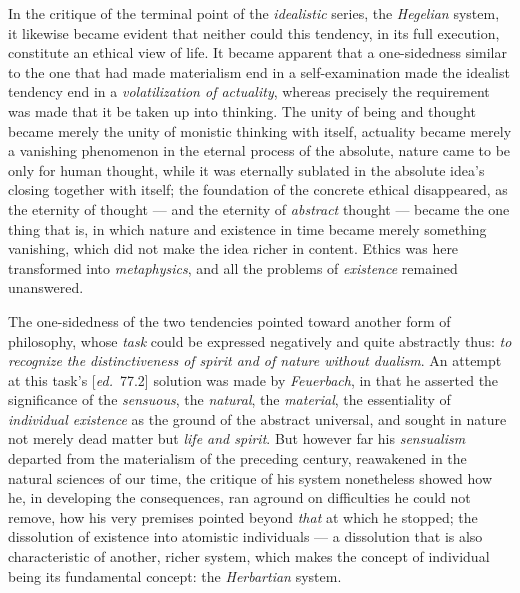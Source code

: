 \documentclass[12pt,a4paper,openany]{book}
\newcommand{\kpage}[1]{\marginnote{\footnotesize\textit{[#1]}}}
\newcommand{\ed}[1]{{\small[\textit{ed.}\ #1]}}
\begin{document}
In the critique of the terminal point of the \emph{idealistic} series, the \emph{Hegelian}
system, it likewise became evident that neither could this tendency, in its
\kpage{182}full execution, constitute an ethical view of life. It became
apparent that a one-sidedness similar to the one that had made materialism
end in a self-examination made the idealist tendency
end in a \emph{volatilization of actuality}, whereas precisely the requirement was made
that it be taken up into thinking. The unity of being and thought became
merely the unity of monistic thinking with itself, actuality
became merely a vanishing phenomenon in the eternal process of the absolute,
nature came to be only for human thought, while it was eternally
sublated in the absolute idea's closing together with itself; the
foundation of the concrete ethical disappeared, as the eternity of thought --- and
the eternity of \emph{abstract} thought --- became the one thing that is, in which nature
and existence in time became merely something vanishing, which did not make
the idea richer in content. Ethics was here transformed into \emph{metaphysics},
and all the problems of \emph{existence} remained unanswered.

The one-sidedness of the two tendencies pointed toward another
form of philosophy, whose \emph{task} could be expressed negatively and quite abstractly
thus: \emph{to recognize the distinctiveness of spirit and of nature
without dualism}. An attempt at this task's \ed{77.2} solution was made by
\emph{Feuerbach}, in that he asserted the significance of the \emph{sensuous}, the \emph{natural}, the \emph{material},
the essentiality of \emph{individual existence} as the ground of the abstract
universal, and sought in nature not merely dead matter but
\emph{life and spirit}. But however far his \emph{sensualism} departed from the
materialism of the preceding century, reawakened in the natural sciences of our time,
the critique of his system nonetheless showed how
he, in developing the consequences, ran aground on difficulties
he could not remove, how his very premises pointed
beyond \emph{that} at which he stopped; the dissolution of existence into atomistic
individuals --- a dissolution that is also characteristic of
another, richer system, which makes the concept of individual being
its fundamental concept: the \emph{Herbartian} system.
\end{document}
